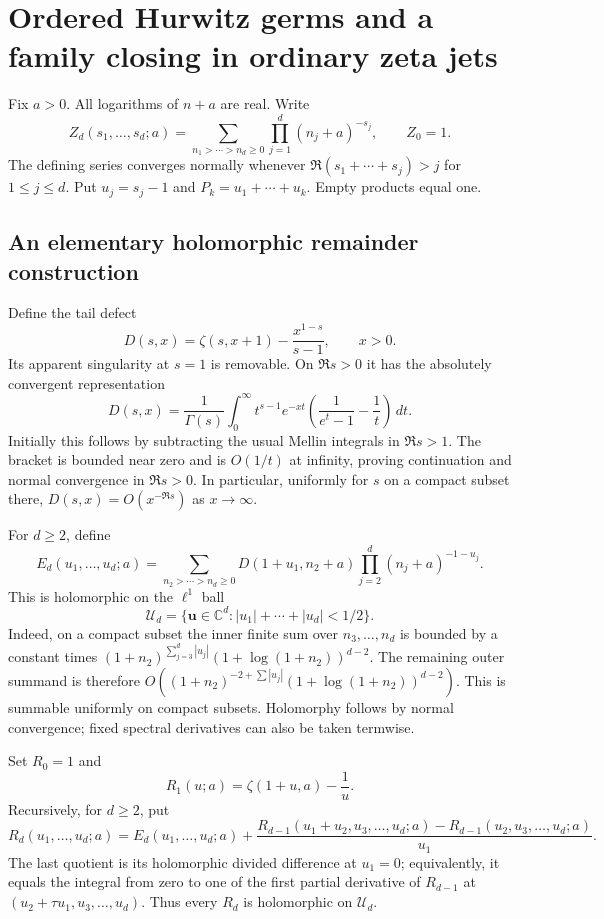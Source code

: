 \section{Ordered Hurwitz germs and a family closing in ordinary zeta jets}

Fix $a>0$. All logarithms of $n+a$ are real. Write
\[
 Z_d(s_1,\ldots,s_d;a)
 =\sum_{n_1>\cdots>n_d\ge0}\prod_{j=1}^d(n_j+a)^{-s_j},
 \qquad Z_0=1.
\]
The defining series converges normally whenever
$\Re(s_1+\cdots+s_j)>j$ for $1\le j\le d$.
Put $u_j=s_j-1$ and $P_k=u_1+\cdots+u_k$.
Empty products equal one.

\subsection{An elementary holomorphic remainder construction}

Define the tail defect
\begin{equation}\label{ord:taildefect}
 D(s,x)=\zeta(s,x+1)-\frac{x^{1-s}}{s-1},\qquad x>0.
\end{equation}
Its apparent singularity at $s=1$ is removable. On $\Re s>0$ it has
the absolutely convergent representation
\begin{equation}\label{ord:tailmellin}
 D(s,x)=\frac1{\Gamma(s)}\int_0^\infty
 t^{s-1}e^{-xt}\left(\frac1{e^t-1}-\frac1t\right)\,dt.
\end{equation}
Initially this follows by subtracting the usual Mellin integrals in
$\Re s>1$. The bracket is bounded near zero and is $O(1/t)$ at
infinity, proving continuation and normal convergence in $\Re s>0$.
In particular, uniformly for $s$ on a compact subset there,
$D(s,x)=O(x^{-\Re s})$ as $x\to\infty$.

For $d\ge2$, define
\begin{equation}\label{ord:Edef}
 E_d(u_1,\ldots,u_d;a)
 =\sum_{n_2>\cdots>n_d\ge0}
 D(1+u_1,n_2+a)\prod_{j=2}^d(n_j+a)^{-1-u_j}.
\end{equation}
This is holomorphic on the $\ell^1$ ball
\[
 \mathcal U_d=\{\mathbf u\in\mathbb C^d:
                         |u_1|+\cdots+|u_d|<1/2\}.
\]
Indeed, on a compact subset the inner finite sum over $n_3,\ldots,n_d$
is bounded by a constant times
$(1+n_2)^{\sum_{j=3}^d|u_j|}(1+\log(1+n_2))^{d-2}$.
The remaining outer summand is therefore
$O((1+n_2)^{-2+\sum|u_j|}(1+\log(1+n_2))^{d-2})$.
This is summable uniformly on compact subsets. Holomorphy follows by
normal convergence; fixed spectral derivatives can also be taken termwise.

Set $R_0=1$ and
\[
 R_1(u;a)=\zeta(1+u,a)-\frac1u.
\]
Recursively, for $d\ge2$, put
\begin{equation}\label{ord:Rrecursion}
 R_d(u_1,\ldots,u_d;a)=E_d(u_1,\ldots,u_d;a)
 +\frac{R_{d-1}(u_1+u_2,u_3,\ldots,u_d;a)
             -R_{d-1}(u_2,u_3,\ldots,u_d;a)}{u_1}.
\end{equation}
The last quotient is its holomorphic divided difference at $u_1=0$;
equivalently, it equals the integral from zero to one of the first
partial derivative of $R_{d-1}$ at
$(u_2+\tau u_1,u_3,\ldots,u_d)$. Thus every $R_d$ is holomorphic on
$\mathcal U_d$.


